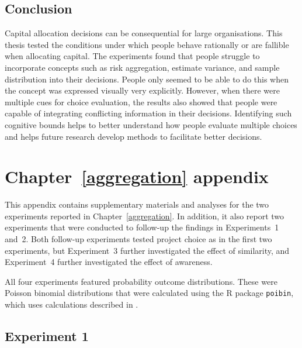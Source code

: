 \documentclass[a4paper, nobind, dvipsnames]{templates/ociamthesis}
\theoremstyle{definition}
\theoremstyle{definition}
\theoremstyle{definition}
\theoremstyle{definition}
\theoremstyle{remark}
\begin{document}
\hypertarget{conclusion}{%
\section{Conclusion}\label{conclusion}}

Capital allocation decisions can be consequential for large organisations. This
thesis tested the conditions under which people behave rationally or are
fallible when allocating capital. The experiments found that people struggle to
incorporate concepts such as risk aggregation, estimate variance, and sample
distribution into their decisions. People only seemed to be able to do this when
the concept was expressed visually very explicitly. However, when there were
multiple cues for choice evaluation, the results also showed that people were
capable of integrating conflicting information in their decisions. Identifying
such cognitive bounds helps to better understand how people evaluate multiple
choices and helps future research develop methods to facilitate better
decisions.

\newpage

\printbibliography[segment=\therefsegment,heading=subbibintoc]

\appendix


\hypertarget{aggregation-appendix}{%
\chapter{Chapter~\ref{aggregation} appendix}\label{aggregation-appendix}}

\minitoc

This appendix contains supplementary materials and analyses for the two
experiments reported in Chapter~\ref{aggregation}. In addition, it also report
two experiments that were conducted to follow-up the findings in Experiments~1
and~2. Both follow-up experiments tested project choice as in the first two
experiments, but Experiment~3 further investigated the effect of similarity, and
Experiment~4 further investigated the effect of awareness.

All four experiments featured probability outcome distributions. These were
Poisson binomial distributions that were calculated using the R package
\texttt{poibin}, which uses calculations described in \textcite{hong2013}.

\section{Experiment 1}
\end{document}
